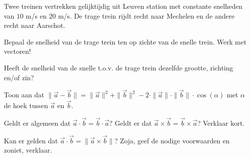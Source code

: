 \documentclass{ximera}
\begin{document}
\begin{exercise}
	Twee treinen vertrekken gelijktijdig uit Leuven station met constante snelheden van \(10\) m/s en \(20\) m/s. 
	De trage trein rijdt recht naar Mechelen en de andere recht naar Aarschot. 
	
	\begin{image}
	\end{image}

	\begin{question}
		Bepaal de snelheid van de trage trein ten op zichte van de snelle trein. Werk met vectoren!
	\end{question}

	\begin{question}
		Heeft de snelheid van de snelle t.o.v. de trage trein dezelfde grootte, richting en/of zin?
	\end{question}
	\end{exercise}

\begin{exercise}
	Toon aan dat \( \| \vec{a} - \vec{b} \| = \|\vec{a}\|^2 + \|\vec{b}\|^2 - 2 \cdot \|\vec{a}\| \cdot \|\vec{b}\| \cdot \cos(\alpha)\) met \(\alpha\) de hoek tussen \(\vec{a}\) en \(\vec{b}\). 
\end{exercise}

\begin{exercise}
	Geldt er algemeen dat \(\vec{a} \cdot \vec{b} = \vec{b} \cdot \vec{a}\)? 
	Geldt er dat \(\vec{a} \times \vec{b} = \vec{b} \times \vec{a}\)? 
	Verklaar kort.
\end{exercise}

\begin{exercise}
	Kan er gelden dat \(\vec{a} \cdot \vec{b} = \| \vec{a} \times \vec{b} \|\)? 
	Zoja, geef de nodige voorwaarden en zoniet, verklaar. 
\end{exercise}
\end{document}

